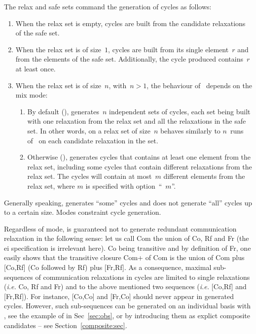 The relax and safe sets command the generation of
cycles as follows:
\begin{enumerate}
\item When the relax set is empty,
cycles are built from the candidate relaxations of the safe set.
\item When the relax set is of size~$1$,
cycles are built from its single element~$r$ and from the elements of
the safe set. Additionally, the cycle produced contains~$r$ at least once.
\item
When the relax set is of size~$n$, with~$n > 1$,
the behaviour of~\diy{} depends on the mix mode:
\begin{enumerate}
\item
By default (),
\diy{} generates~$n$ independent sets of cycles,
each set being built with one relaxation from the relax set and all
the relaxations in the safe set.
In other words, \diy{} on a relax set of size~$n$ behaves similarly
to $n$~runs of~\diy{} on each candidate relaxation in the set.
\item Otherwise (), \diy{} generates cycles that contains
at least one element from the relax set, including some cycles
that contain different relaxations from the relax set.
The cycles will contain at most~$m$ different elements from the relax set,
where $m$ is specified with option~``~$m$''.
\end{enumerate}
\end{enumerate}

\label{mode:describe}Generally
speaking, \diy{} generates ``some'' cycles and does not generate
``all'' cycles up to a certain size. Modes constraint cycle generation.

Regardless of mode, \diy{} is guaranteed not to
generate redundant communication relaxation in the following sense:
let us call Com the union of Co, Rf and Fr (the e\vbar{}i specification
is irrelevant here).
Co being transitive and by definition of Fr,
one easily shows that the transitive closure Com+ of Com is the union
of Com plus [Co,Rf] (Co followed by Rf) plus [Fr,Rf].
As a consequence, maximal sub-sequences of communication
relaxations in \diy{} cycles are limited
to  single relaxations (\emph{i.e.} Co, Rf and Fr)
and to the above mentioned two sequences
(\emph{i.e.} [Co,Rf] and  [Fr,Rf]).
For instance, [Co,Co] and [Fr,Co] should never appear in \diy{} generated
cycles. However, such sub-sequences can be generated on an individual basis with
\diyone, see the example of  in Sec~\ref{sec:obs},
or by introducing them as explict composite candidates -- see Section~\ref{composite:sec}.

